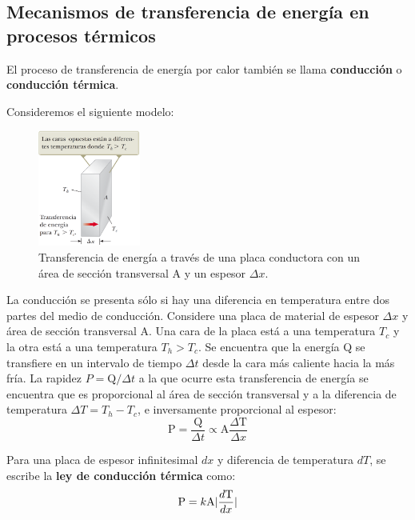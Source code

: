 \subsection{Mecanismos de transferencia de energía en procesos térmicos}

  \PN El proceso de transferencia de energía por calor también se llama \textbf{conducción} o \textbf{conducción
  térmica}.

  \vspace{3mm}
  \PN Consideremos el siguiente modelo:
  \begin{figure}[H]
  \centering
    \includegraphics[width=0.3\textwidth]{3/figure_1}
    \caption{Transferencia de energía a través de una placa conductora con un área de sección transversal A y un espesor
    $\Delta x$.}
  \end{figure}

  \PN La conducción se presenta sólo si hay una diferencia en temperatura entre dos partes del medio de conducción.
  Considere una placa de material de espesor $\Delta x$ y área de sección transversal A. Una cara de la placa está a una
  temperatura $T_{c}$ y la otra está a una temperatura $T_{h} > T_{c}$. Se encuentra que la energía Q se transfiere en
  un intervalo de tiempo $\Delta t$ desde la cara más caliente hacia la más fría. La rapidez $P = \text{Q} / \Delta t$ a
  la que ocurre esta transferencia de energía se encuentra que es proporcional al área de sección transversal y a la
  diferencia de temperatura $\Delta T = T_{h} - T_{c}$, e inversamente proporcional al espesor:
  \begin{equation*}
    \text{P} = \frac{\text{Q}}{\Delta t} \propto \text{A} \frac{\Delta \text{T}}{\Delta x}
  \end{equation*}

  \PN Para una placa de espesor infinitesimal $dx$ y diferencia de temperatura $dT$, se escribe la \textbf{ley de
  conducción térmica} como:
  \begin{equation*}
    \text{P} = k \text{A} \lvert\frac{d\text{T}}{dx}\rvert
  \end{equation*}

